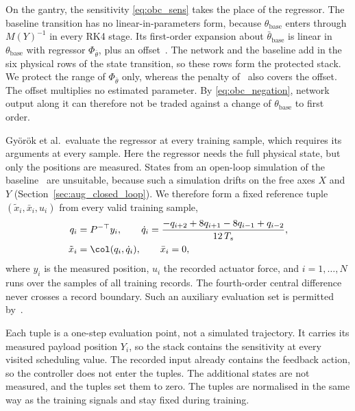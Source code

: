 On the gantry, the sensitivity \eqref{eq:obc_sens} takes the place of the
regressor.
The baseline transition has no linear-in-parameters form, because
$\theta_{\mathrm{base}}$ enters through $M(Y)^{-1}$ in every RK4 stage.
Its first-order expansion about $\bar\theta_{\mathrm{base}}$ is linear in
$\theta_{\mathrm{base}}$ with regressor $\Phi_{\bar\theta}$, plus an
offset~\cite[Eq.~(16)]{gyorok2025l4dc}.
The network and the baseline add in the six physical rows of the state
transition, so these rows form the protected stack.
We protect the range of $\Phi_{\bar\theta}$ only, whereas the penalty
of~\cite[Eq.~(18)]{gyorok2025l4dc} also covers the offset.
The offset multiplies no estimated parameter.
By \eqref{eq:obc_negation}, network output along it can therefore not be
traded against a change of $\theta_{\mathrm{base}}$ to first order.

Gy\"or\"ok et al.\ evaluate the regressor at every training sample, which
requires its arguments at every sample.
Here the regressor needs the full physical state, but only the positions are
measured.
States from an open-loop simulation of the
baseline~\cite[Sec.~3]{gyorok2025l4dc} are unsuitable, because such a
simulation drifts on the free axes $X$ and $Y$
(Section~\ref{sec:aug_closed_loop}).
We therefore form a fixed reference tuple $(\tilde x_i,\bar x_i,u_i)$ from
every valid training sample,
\begin{equation}
\begin{aligned}
 q_i&=P^{-\top}y_i,\qquad
 \dot q_i=\frac{-q_{i+2}+8q_{i+1}-8q_{i-1}+q_{i-2}}{12\,T_s},\\
 \tilde x_i&=\col(q_i,\dot q_i),\qquad \bar x_i=0,
\end{aligned}
\label{eq:obc_tuples}
\end{equation}
where $y_i$ is the measured position, $u_i$ the recorded actuator force, and
$i=1,\dots,N$ runs over the samples of all training records.
The fourth-order central difference never crosses a record boundary.
Such an auxiliary evaluation set is permitted
by~\cite[Sec.~3.2]{gyorok2026obc}.

Each tuple is a one-step evaluation point, not a simulated trajectory.
It carries its measured payload position $Y_i$, so the stack contains the
sensitivity at every visited scheduling value.
The recorded input already contains the feedback action, so the controller
does not enter the tuples.
The additional states are not measured, and the tuples set them to zero.
The tuples are normalised in the same way as the training signals and stay
fixed during training.

